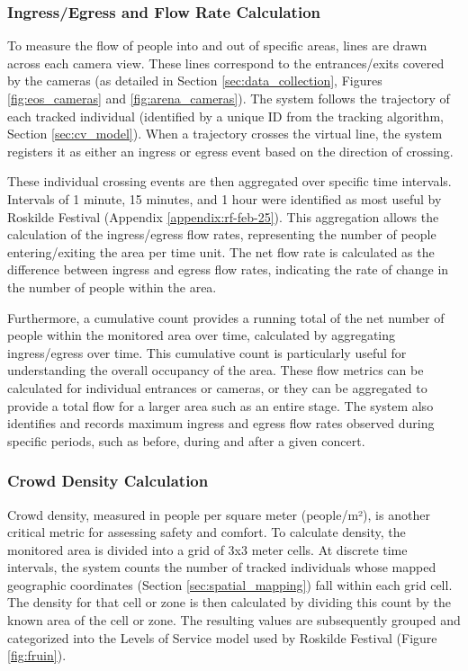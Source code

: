 \subsubsection{Ingress/Egress and Flow Rate Calculation}

To measure the flow of people into and out of specific areas, lines are drawn across each camera view. These lines correspond to the entrances/exits covered by the cameras (as detailed in Section \ref{sec:data_collection}, Figures \ref{fig:eos_cameras} and \ref{fig:arena_cameras}). The system follows the trajectory of each tracked individual (identified by a unique ID from the tracking algorithm, Section \ref{sec:cv_model}). When a trajectory crosses the virtual line, the system registers it as either an ingress or egress event based on the direction of crossing.

These individual crossing events are then aggregated over specific time intervals. Intervals of 1 minute, 15 minutes, and 1 hour were identified as most useful by Roskilde Festival (Appendix \ref{appendix:rf-feb-25}). This aggregation allows the calculation of the ingress/egress flow rates, representing the number of people entering/exiting the area per time unit. The net flow rate is calculated as the difference between ingress and egress flow rates, indicating the rate of change in the number of people within the area.

Furthermore, a cumulative count provides a running total of the net number of people within the monitored area over time, calculated by aggregating ingress/egress over time. This cumulative count is particularly useful for understanding the overall occupancy of the area. These flow metrics can be calculated for individual entrances or cameras, or they can be aggregated to provide a total flow for a larger area such as an entire stage. The system also identifies and records maximum ingress and egress flow rates observed during specific periods, such as before, during and after a given concert.

\subsubsection{Crowd Density Calculation}
Crowd density, measured in people per square meter (people/m²), is another critical metric for assessing safety and comfort. To calculate density, the monitored area is divided into a grid of 3x3 meter cells. At discrete time intervals, the system counts the number of tracked individuals whose mapped geographic coordinates (Section \ref{sec:spatial_mapping}) fall within each grid cell. The density for that cell or zone is then calculated by dividing this count by the known area of the cell or zone. The resulting values are subsequently grouped and categorized into the Levels of Service model used by Roskilde Festival (Figure \ref{fig:fruin}).

